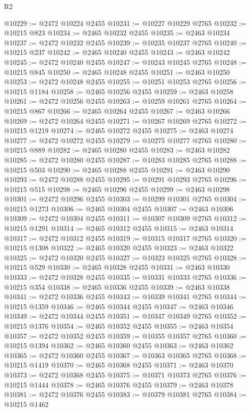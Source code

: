 \begin{lexlean}{R2}
\begin{coremodule}
@10229 := @2472 @10224 @2455
@10231 := @10227 @10229 @2765
@10232 := @10215 @823
@10234 := @2465 @10232 @2455
@10235 := @2463 @10234
@10237 := @2472 @10232 @2455
@10239 := @10235 @10237 @2765
@10240 := @10215 @237
@10242 := @2465 @10240 @2455
@10243 := @2463 @10242
@10245 := @2472 @10240 @2455
@10247 := @10243 @10245 @2765
@10248 := @10215 @845
@10250 := @2465 @10248 @2455
@10251 := @2463 @10250
@10253 := @2472 @10248 @2455
@10255 := @10251 @10253 @2765
@10256 := @10215 @1184
@10258 := @2465 @10256 @2455
@10259 := @2463 @10258
@10261 := @2472 @10256 @2455
@10263 := @10259 @10261 @2765
@10264 := @10215 @867
@10266 := @2465 @10264 @2455
@10267 := @2463 @10266
@10269 := @2472 @10264 @2455
@10271 := @10267 @10269 @2765
@10272 := @10215 @1219
@10274 := @2465 @10272 @2455
@10275 := @2463 @10274
@10277 := @2472 @10272 @2455
@10279 := @10275 @10277 @2765
@10280 := @10215 @889
@10282 := @2465 @10280 @2455
@10283 := @2463 @10282
@10285 := @2472 @10280 @2455
@10287 := @10283 @10285 @2765
@10288 := @10215 @503
@10290 := @2465 @10288 @2455
@10291 := @2463 @10290
@10293 := @2472 @10288 @2455
@10295 := @10291 @10293 @2765
@10296 := @10215 @515
@10298 := @2465 @10296 @2455
@10299 := @2463 @10298
@10301 := @2472 @10296 @2455
@10303 := @10299 @10301 @2765
@10304 := @10215 @1273
@10306 := @2465 @10304 @2455
@10307 := @2463 @10306
@10309 := @2472 @10304 @2455
@10311 := @10307 @10309 @2765
@10312 := @10215 @1291
@10314 := @2465 @10312 @2455
@10315 := @2463 @10314
@10317 := @2472 @10312 @2455
@10319 := @10315 @10317 @2765
@10320 := @10215 @1308
@10322 := @2465 @10320 @2455
@10323 := @2463 @10322
@10325 := @2472 @10320 @2455
@10327 := @10323 @10325 @2765
@10328 := @10215 @529
@10330 := @2465 @10328 @2455
@10331 := @2463 @10330
@10333 := @2472 @10328 @2455
@10335 := @10331 @10333 @2765
@10336 := @10215 @354
@10338 := @2465 @10336 @2455
@10339 := @2463 @10338
@10341 := @2472 @10336 @2455
@10343 := @10339 @10341 @2765
@10344 := @10215 @1359
@10346 := @2465 @10344 @2455
@10347 := @2463 @10346
@10349 := @2472 @10344 @2455
@10351 := @10347 @10349 @2765
@10352 := @10215 @1376
@10354 := @2465 @10352 @2455
@10355 := @2463 @10354
@10357 := @2472 @10352 @2455
@10359 := @10355 @10357 @2765
@10360 := @10215 @1394
@10362 := @2465 @10360 @2455
@10363 := @2463 @10362
@10365 := @2472 @10360 @2455
@10367 := @10363 @10365 @2765
@10368 := @10215 @1419
@10370 := @2465 @10368 @2455
@10371 := @2463 @10370
@10373 := @2472 @10368 @2455
@10375 := @10371 @10373 @2765
@10376 := @10215 @1444
@10378 := @2465 @10376 @2455
@10379 := @2463 @10378
@10381 := @2472 @10376 @2455
@10383 := @10379 @10381 @2765
@10384 := @10215 @1462

\end{coremodule}
\end{lexlean}
